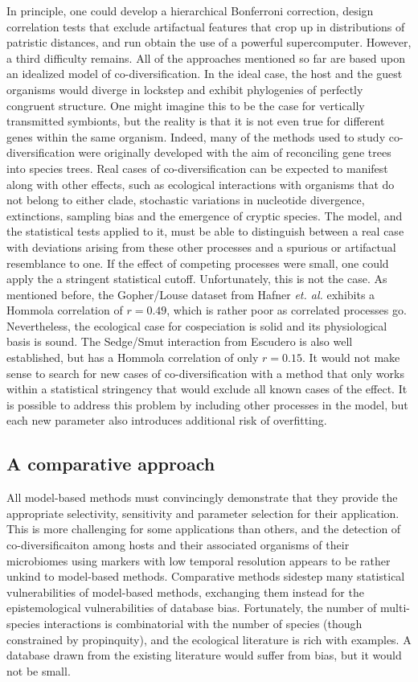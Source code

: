 In principle, one could develop a hierarchical Bonferroni correction, design correlation tests that exclude artifactual features that crop up in distributions of patristic distances, and run obtain the use of a powerful supercomputer. However, a third difficulty remains. All of the approaches mentioned so far are based upon an idealized model of co-diversification. In the ideal case, the host and the guest organisms would diverge in lockstep and exhibit phylogenies of perfectly congruent structure. One might imagine this to be the case for vertically transmitted symbionts, but the reality is that it is not even true for different genes within the same organism. Indeed, many of the methods used to study co-diversification were originally developed with the aim of reconciling gene trees into species trees. Real cases of co-diversification can be expected to manifest along with other effects, such as ecological interactions with organisms that do not belong to either clade, stochastic variations in nucleotide divergence, extinctions, sampling bias and the emergence of cryptic species. The model, and the statistical tests applied to it, must be able to distinguish between a real case with deviations arising from these other processes and a spurious or artifactual resemblance to one. If the effect of competing processes were small, one could apply the a stringent statistical cutoff. Unfortunately, this is not the case. As mentioned before, the Gopher/Louse dataset from Hafner {\em et. al.} exhibits a Hommola correlation of $r=0.49$, which is rather poor as correlated processes go. Nevertheless, the ecological case for cospeciation is solid and its physiological basis is sound. The Sedge/Smut interaction from Escudero \cite{escudero2015phylogenetic} is also well established, but has a Hommola correlation of only $r=0.15$. It would not make sense to search for new cases of co-diversification with a method that only works within a statistical stringency that would exclude all known cases of the effect. It is possible to address this problem by including other processes in the model, but each new parameter also introduces additional risk of overfitting.

\subsection{A comparative approach}

All model-based methods must convincingly demonstrate that they provide the appropriate selectivity, sensitivity and parameter selection for their application. This is more challenging for some applications than others, and the detection of co-diversificaiton among hosts and their associated organisms of their microbiomes using markers with low temporal resolution appears to be rather unkind to model-based methods. Comparative methods sidestep many statistical vulnerabilities of model-based methods, exchanging them instead for the epistemological vulnerabilities of database bias. Fortunately, the number of multi-species interactions is combinatorial with the number of species (though constrained by propinquity), and the ecological literature is rich with examples. A database drawn from the existing literature would suffer from bias, but it would not be small.

